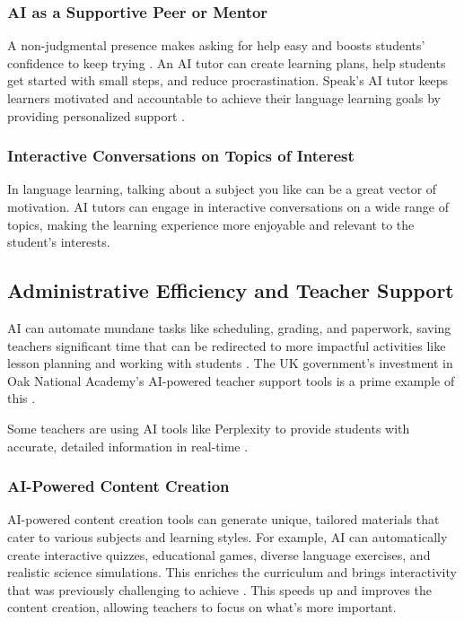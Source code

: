 \documentclass{article}
\begin{document}
\subsubsection{AI as a Supportive Peer or Mentor}

A non-judgmental presence makes asking for help easy and
boosts students' confidence to keep trying
\cite{springer_ai_education}.
An AI tutor can create learning plans,
help students get started with small steps,
and reduce procrastination. Speak's AI tutor keeps
learners motivated and accountable to achieve their
language learning goals by providing personalized support
\cite{speak}.

\subsubsection{Interactive Conversations on Topics of Interest}

In language learning, talking about a subject you like can be
a great vector of motivation. AI tutors can engage in interactive
conversations on a wide range of topics, making the learning
experience more enjoyable and relevant to the student's interests.

\subsection{Administrative Efficiency and Teacher Support}

AI can automate mundane tasks like scheduling, grading, and
paperwork, saving teachers significant time that can be redirected
to more impactful activities like lesson planning and working with
students \cite{datasciencecentral_automated_grading} \cite{mckinsey_ai_k12_teachers}.
The UK government's investment in Oak National Academy's
AI-powered teacher support tools is a prime example
of this \cite{govuk_ai_teacher_support}
\cite{openaccessgov_ai_teacher_support}.

Some teachers are using AI tools like Perplexity to provide
students with accurate, detailed information in real-time
\cite{tri_cityherald_ai_cheating}.


\subsubsection{AI-Powered Content Creation}

AI-powered content creation tools can generate unique,
tailored materials that cater to various subjects and learning styles.
For example, AI can automatically create interactive quizzes,
educational games, diverse language exercises, and realistic
science simulations. This enriches the curriculum and brings
interactivity that was previously challenging to achieve
\cite{neurosys2023generative}.
This speeds up and improves the content creation,
allowing teachers to focus on what's more important.
\end{document}
